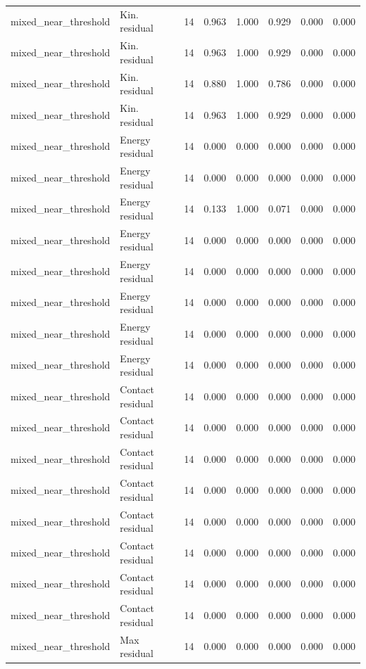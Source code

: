 {\begin{longtable}{llrrrrrr}
mixed\_near\_threshold & Kin. residual & 14 & 0.963 & 1.000 & 0.929 & 0.000 & 0.000 \\
mixed\_near\_threshold & Kin. residual & 14 & 0.963 & 1.000 & 0.929 & 0.000 & 0.000 \\
mixed\_near\_threshold & Kin. residual & 14 & 0.880 & 1.000 & 0.786 & 0.000 & 0.000 \\
mixed\_near\_threshold & Kin. residual & 14 & 0.963 & 1.000 & 0.929 & 0.000 & 0.000 \\
mixed\_near\_threshold & Energy residual & 14 & 0.000 & 0.000 & 0.000 & 0.000 & 0.000 \\
mixed\_near\_threshold & Energy residual & 14 & 0.000 & 0.000 & 0.000 & 0.000 & 0.000 \\
mixed\_near\_threshold & Energy residual & 14 & 0.133 & 1.000 & 0.071 & 0.000 & 0.000 \\
mixed\_near\_threshold & Energy residual & 14 & 0.000 & 0.000 & 0.000 & 0.000 & 0.000 \\
mixed\_near\_threshold & Energy residual & 14 & 0.000 & 0.000 & 0.000 & 0.000 & 0.000 \\
mixed\_near\_threshold & Energy residual & 14 & 0.000 & 0.000 & 0.000 & 0.000 & 0.000 \\
mixed\_near\_threshold & Energy residual & 14 & 0.000 & 0.000 & 0.000 & 0.000 & 0.000 \\
mixed\_near\_threshold & Energy residual & 14 & 0.000 & 0.000 & 0.000 & 0.000 & 0.000 \\
mixed\_near\_threshold & Contact residual & 14 & 0.000 & 0.000 & 0.000 & 0.000 & 0.000 \\
mixed\_near\_threshold & Contact residual & 14 & 0.000 & 0.000 & 0.000 & 0.000 & 0.000 \\
mixed\_near\_threshold & Contact residual & 14 & 0.000 & 0.000 & 0.000 & 0.000 & 0.000 \\
mixed\_near\_threshold & Contact residual & 14 & 0.000 & 0.000 & 0.000 & 0.000 & 0.000 \\
mixed\_near\_threshold & Contact residual & 14 & 0.000 & 0.000 & 0.000 & 0.000 & 0.000 \\
mixed\_near\_threshold & Contact residual & 14 & 0.000 & 0.000 & 0.000 & 0.000 & 0.000 \\
mixed\_near\_threshold & Contact residual & 14 & 0.000 & 0.000 & 0.000 & 0.000 & 0.000 \\
mixed\_near\_threshold & Contact residual & 14 & 0.000 & 0.000 & 0.000 & 0.000 & 0.000 \\
mixed\_near\_threshold & Max residual & 14 & 0.000 & 0.000 & 0.000 & 0.000 & 0.000 \\

\end{longtable}}
